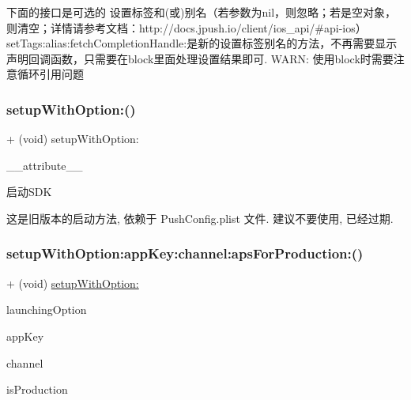 下面的接口是可选的 设置标签和(或)别名（若参数为nil，则忽略；若是空对象，则清空；详情请参考文档：http\+://docs.jpush.\+io/client/ios\+\_\+api/\#api-\/ios） set\+Tags\+:alias\+:fetch\+Completion\+Handle\+:是新的设置标签别名的方法，不再需要显示声明回调函数，只需要在block里面处理设置结果即可. W\+A\+RN\+: 使用block时需要注意循环引用问题 \mbox{\label{interface_j_p_u_s_h_service_a2266fd57b52be8614de9da9673bb24d8}} 
\subsubsection{\texorpdfstring{setup\+With\+Option\+:()}{setupWithOption:()}}
{\footnotesize\ttfamily + (void) setup\+With\+Option\+: \begin{DoxyParamCaption}\item[{((deprecated(\char`\"{}J\+Push 2.\+1.\+0 版本已过期\char`\"{})))}]{\+\_\+\+\_\+attribute\+\_\+\+\_\+ }\end{DoxyParamCaption}}

启动\+S\+DK

这是旧版本的启动方法, 依赖于 Push\+Config.\+plist 文件. 建议不要使用, 已经过期. \mbox{\label{interface_j_p_u_s_h_service_a8c68e03465a687861b8a2e680a433881}} 
\subsubsection{\texorpdfstring{setup\+With\+Option\+:app\+Key\+:channel\+:aps\+For\+Production\+:()}{setupWithOption:appKey:channel:apsForProduction:()}}
{\footnotesize\ttfamily + (void) \mbox{\hyperlink{interface_j_p_u_s_h_service_a2266fd57b52be8614de9da9673bb24d8}{setup\+With\+Option\+:}} \begin{DoxyParamCaption}\item[{(N\+S\+Dictionary $\ast$)}]{launching\+Option }\item[{appKey:(N\+S\+String $\ast$)}]{app\+Key }\item[{channel:(N\+S\+String $\ast$)}]{channel }\item[{apsForProduction:(B\+O\+OL)}]{is\+Production }\end{DoxyParamCaption}}

